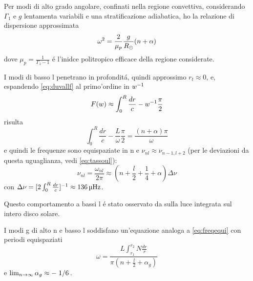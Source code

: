 \documentclass[../main.tex]{subfiles}
\begin{document}
Per modi di alto grado angolare, confinati nella regione convettiva, considerando $\Gamma_1$ e $g$ lentamenta variabili e una stratificazione adiabatica, ho la relazione di dispersione approssimata
\begin{equation}
\omega^2=\frac{2}{\mu_p}\frac{g}{R_{\odot}{}}(n+\alpha)
\end{equation}
dove $\mu_p=\frac{1}{\Gamma_1-1}$ \'e l'inidce politropico efficace della regione considerate.

I modi di basso l penetrano in profondit\'a, quindi approssimo $r_t\approx0$, e, espandendo \eqref{eq:duvallf} al primo'ordine in ${w}^{-1}$
\begin{equation}
F(w)\approx\int_0^R\frac{dr}{c}-w^{-1}\frac{\pi}{2}\label{eq:Flinear}
\end{equation}
 risulta
\begin{equation}
\int_0^R\frac{dr}{c}-\frac{L}{\omega}\frac{\pi}{2}=\frac{(n+\alpha)\pi}{\omega}
\end{equation}
e quindi le  frequenze sono equispaziate in n e $\nu_{nl}\approx\nu_{n-1,l+2}$ (per le deviazioni da questa uguaglianza, vedi \eqref{eq:tassoul}):
\begin{equation}
\nu_{nl}=\frac{\omega_{nl}}{2\pi}\approx(n+\frac{l}{2}+\frac{1}{4}+\alpha)\Delta\nu\label{eq:freqequi}
\end{equation}
con $\Delta\nu=[2\int_0^R\frac{dr}{c}]^{-1}\approx\SI{136}{\micro\hertz}$.

Questo comportamento a bassi l \'e stato osservato da \cite{cla79solar} sulla luce integrata sul intero disco solare.


I modi g di alto n e basso l soddisfano un'equazione analoga a \eqref{eq:freqequi} con periodi equispaziati
\begin{equation}
\omega=\frac{L\int_{r_1}^{r_2}N\frac{dr}{r}}{\pi(n+\frac{l}{2}+\alpha_g)}
\end{equation}
e $\lim_{n\to\infty}{\alpha_g}\approx-\left.{1}\middle/{6}\right.$.
\end{document}
